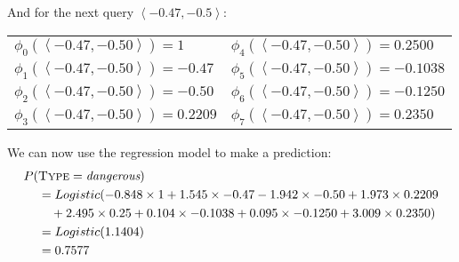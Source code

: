 \documentclass[solution]{ditpaper}
\begin{document}
\begin{enumerate}
\begin{answer}
% 
%
And for the next query $\left<-0.47, -0.5\right>$:
			\begin{center}
\begin{tabular}[ht]{ l  l  }
$\phi_0(\left<-0.47, -0.50\right>) =  1$ & $\phi_4(\left<-0.47, -0.50\right>) = 0.2500$ \\
$\phi_1(\left<-0.47, -0.50\right>) = -0.47$ & $\phi_5(\left<-0.47, -0.50\right>) = -0.1038$ \\
$\phi_2(\left<-0.47, -0.50\right>) = -0.50$ &$\phi_6(\left<-0.47, -0.50\right>) = -0.1250$  \\
$\phi_3(\left<-0.47, -0.50\right>) = 0.2209$ & $\phi_7(\left<-0.47, -0.50\right>) = 0.2350$ \\
\end{tabular}
\end{center}
	We can now use the regression model to make a prediction:
		\begin{alignat*}{2}				
P(&\textsc{Type}=\textit{dangerous}) \\
& = Logistic(-0.848\times 1 + 1.545 \times -0.47 -1.942 \times  -0.50 + 1.973 \times 0.2209 \\
&  ~~~  +  2.495   \times 0.25 + 0.104 \times -0.1038 + 0.095 \times -0.1250 + 3.009\times 0.2350) \\
& =  Logistic(1.1404)  \\
& = 0.7577 
\end{alignat*}
 

\end{answer}
\end{enumerate}
\end{document}

